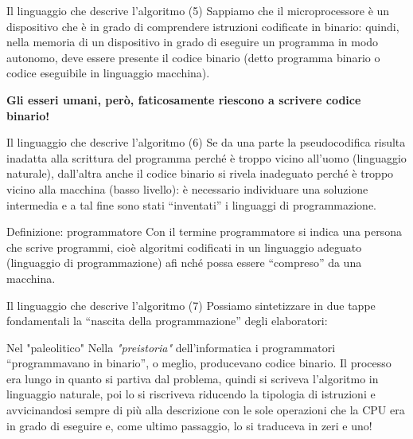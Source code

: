 \documentclass[
    notheorems,
    11pt,
    compress,
    aspectratio=169
]{beamer}
\begin{document}
\begin{frame}{Il linguaggio che descrive l'algoritmo (5)}
    Sappiamo che il microprocessore è un dispositivo che è in grado di comprendere istruzioni codificate in binario: quindi, nella memoria di un dispositivo in grado di eseguire un programma in modo autonomo, deve essere presente il codice binario (detto programma binario o codice eseguibile in linguaggio macchina).

    \pause
    \vspace{0.25cm}

    \textbf{Gli esseri umani, però, faticosamente riescono a scrivere codice binario!}
\end{frame}

\begin{frame}{Il linguaggio che descrive l'algoritmo (6)}
    Se da una parte la pseudocodifica risulta inadatta alla scrittura del programma perché è troppo vicino all’uomo (linguaggio naturale), dall’altra anche il codice binario si rivela inadeguato perché è troppo vicino alla macchina (basso livello): è necessario individuare una soluzione intermedia e a tal fine sono stati “inventati” i linguaggi di programmazione.

    \pause
    \vspace{0.25cm}

    \begin{block}{Definizione: programmatore}
        Con il termine programmatore si indica una persona che scrive programmi, cioè algoritmi codificati in un linguaggio adeguato (linguaggio di programmazione) afi nché possa essere “compreso” da una macchina.
    \end{block}
\end{frame}

\begin{frame}{Il linguaggio che descrive l'algoritmo (7)}
    Possiamo sintetizzare in due tappe fondamentali la “nascita della programmazione” degli elaboratori:

    \vspace{0.25cm}

    \begin{block}{Nel "paleolitico"}
        Nella \textit{"preistoria"} dell’informatica i programmatori “programmavano in binario”, o meglio, producevano codice binario. Il processo era lungo in quanto si partiva dal problema, quindi si scriveva l’algoritmo in linguaggio naturale, poi lo si riscriveva riducendo la tipologia di istruzioni e avvicinandosi sempre di più alla descrizione con le sole operazioni che la CPU era in grado di eseguire e, come ultimo passaggio, lo si traduceva in zeri e uno!
    \end{block}
\end{frame}
\end{document}
